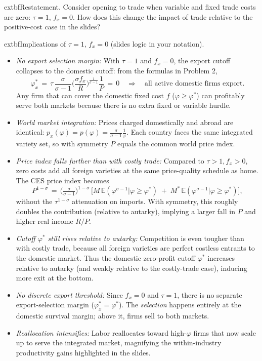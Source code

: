 \begin{solution}
	extbf{Restatement.} Consider opening to trade when variable and fixed trade costs are zero: $\tau=1$, $f_x=0$. How does this change the impact of trade relative to the positive-cost case in the slides?

\bigskip
	extbf{Implications of $\tau=1$, $f_x=0$ (slides logic in your notation).}
\begin{itemize}
	\item \emph{No export selection margin:} With $\tau=1$ and $f_x=0$, the export cutoff collapses to the domestic cutoff: from the formulas in Problem 2,
	\[
		\varphi_x^* \,=\, \tau\, \frac{\sigma}{\sigma-1}\Big(\frac{\sigma f_x}{R}\Big)^{\!\tfrac{1}{\sigma-1}} \frac{1}{P} \,=\, 0 \quad \Rightarrow \quad \text{all active domestic firms export.}
	\]
	Any firm that can cover the domestic fixed cost $f$ ($\varphi\ge \varphi^*$) can profitably serve both markets because there is no extra fixed or variable hurdle.
	\item \emph{World market integration:} Prices charged domestically and abroad are identical: $p_x(\varphi)=p(\varphi)=\tfrac{\sigma}{\sigma-1}\tfrac{1}{\varphi}$. Each country faces the same integrated variety set, so with symmetry $P$ equals the common world price index.
	\item \emph{Price index falls further than with costly trade:} Compared to $\tau>1, f_x>0$, zero costs add all foreign varieties at the same price-quality schedule as home. The CES price index becomes
	\[
		P^{1-\sigma} \,=\, \Big(\tfrac{\sigma}{\sigma-1}\Big)^{1-\sigma}\,\Big[ M\, \mathbb{E}(\varphi^{\sigma-1}|\varphi\ge \varphi^*) \; + \; M^*\, \mathbb{E}(\varphi^{\sigma-1}|\varphi\ge \varphi^*) \Big],
	\]
	without the $\tau^{1-\sigma}$ attenuation on imports. With symmetry, this roughly doubles the contribution (relative to autarky), implying a larger fall in $P$ and higher real income $R/P$.
	\item \emph{Cutoff $\varphi^*$ still rises relative to autarky:} Competition is even tougher than with costly trade, because all foreign varieties are perfect costless entrants to the domestic market. Thus the domestic zero-profit cutoff $\varphi^*$ increases relative to autarky (and weakly relative to the costly-trade case), inducing more exit at the bottom.
	\item \emph{No discrete export threshold:} Since $f_x=0$ and $\tau=1$, there is no separate export-selection margin ($\varphi_x^*=\varphi^*$). The \emph{selection} happens entirely at the domestic survival margin; above it, firms sell to both markets.
	\item \emph{Reallocation intensifies:} Labor reallocates toward high-$\varphi$ firms that now scale up to serve the integrated market, magnifying the within-industry productivity gains highlighted in the slides.
\end{itemize}


\end{solution}
